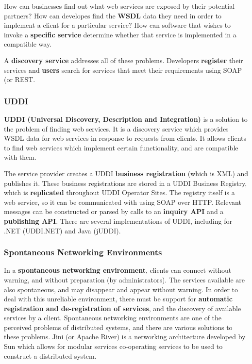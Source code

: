 \documentclass{article}
\begin{document}
How can businesses find out what web services are exposed by their potential partners? How can developes find the \textbf{WSDL} data they need in order to implement a client for a particular service? How can software that wishes to invoke a \textbf{specific service} determine whether that service is implemented in a compatible way.

A \textbf{discovery service} addresses all of these problems. Developers \textbf{register} their services and \textbf{users} search for services  that meet their requirements using SOAP (or REST.

\subsubsection{UDDI}

\textbf{UDDI (Universal Discovery, Description and Integration)} is a solution to the problem of finding web services. It is a discovery service which provides WSDL data for web services in response to requests from clients. It allows clients to find web services which implement certain functionality, and are compatible with them. 

The service provider creates a UDDI \textbf{business registration} (which is XML) and publishes it. These business registrations are stored in a UDDI Business Registry, which is \textbf{replicated} throughout UDDI Operator Sites. The registry itself is a web service, so it can be communicated with using SOAP over HTTP. Relevant messages can be constructed or parsed by calls to an \textbf{inquiry API} and a \textbf{publishing API}. There are several implementations of UDDI, including for .NET (UDDI.NET) and Java (jUDDI). 

\subsubsection{Spontaneous Networking Environments}

In a \textbf{spontaneous networking environment}, clients can connect without warning, and without preparation (by administrators). The services available are also spontaneous, and may disappear and appear without warning. In order to deal with this unreliable environment, there must be support for \textbf{automatic registration and de-registration of services}, and the discovery of available services by a client. Spontaneous networking environments are one of the perceived problems of distributed systems, and there are various solutions to these problems. Jini (or Apache River) is a networking architecture developed by Sun which allows for modular services co-operating services to be used to construct a distributed system.
\end{document}
